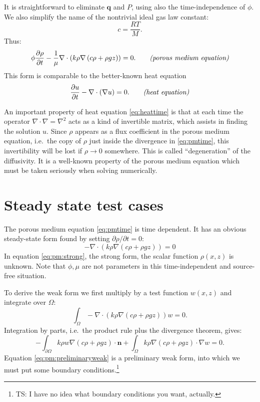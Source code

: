 \documentclass[11pt]{article}
\newcommand{\bn}{\mathbf{n}}
\newcommand{\bq}{\mathbf{q}}
\newcommand{\Div}{\nabla\cdot}
\newcommand{\grad}{\nabla}
\begin{document}
It is straightforward to eliminate $\bq$ and $P$, using also the time-independence of $\phi$.  We also simplify the name of the nontrivial ideal gas law constant:
\begin{equation}
c = \frac{RT}{M}.  \label{eq:crename}
\end{equation}
Thus:
\begin{equation}
\phi \frac{\partial \rho}{\partial t} - \frac{1}{\mu} \Div \left(k \rho \grad\left(c \rho + \rho g z\right)\right) = 0.  \qquad \text{\emph{(porous medium equation)}} \label{eq:pmtime}
\end{equation}
This form is comparable to the better-known heat equation
\begin{equation}
\frac{\partial u}{\partial t} - \Div(\grad u) = 0. \qquad \text{\emph{(heat equation)}}\label{eq:heattime}
\end{equation}

An important property of heat equation \eqref{eq:heattime} is that at each time the operator $\Div \grad = \grad^2$ acts as a kind of invertible matrix, which assists in finding the solution $u$.  Since $\rho$ appears as a flux coefficient in the porous medium equation, i.e.~the copy of $\rho$ just inside the divergence in \eqref{eq:pmtime}, this invertibility will be lost if $\rho\to 0$ somewhere.  This is called ``degeneration'' of the diffusivity.  It is a well-known property of the porous medium equation which must be taken seriously when solving numerically.


\section{Steady state test cases}

The porous medium equation \eqref{eq:pmtime} is time dependent.  It has an obvious steady-state form found by setting $\partial \rho/\partial t = 0$:
\begin{equation}
- \Div \left(k \rho \grad\left(c \rho + \rho g z\right)\right) = 0 \label{eq:pm:strong}
\end{equation}
In equation \eqref{eq:pm:strong}, the strong form, the scalar function $\rho(x,z)$ is unknown.  Note that $\phi,\mu$ are not parameters in this time-independent and source-free situation.  

To derive the weak form we first multiply by a test function $w(x,z)$ and integrate over $\Omega$:
    $$\int_\Omega- \Div \left(k \rho \grad\left(c \rho + \rho g z\right)\right) w = 0.$$
Integration by parts, i.e.~the product rule plus the divergence theorem, gives:
\begin{equation}
- \int_{\partial\Omega} k \rho w \grad\left(c \rho + \rho g z\right) \cdot \bn + \int_\Omega k \rho \grad\left(c \rho + \rho g z\right) \cdot \grad w = 0.\label{eq:pm:preliminaryweak}
\end{equation}
Equation \eqref{eq:pm:preliminaryweak} is a preliminary weak form, into which we must put some boundary conditions.\footnote{TS: I have no idea what boundary conditions you want, actually.}
\end{document}
